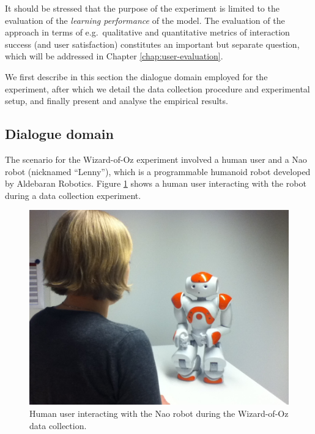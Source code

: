 
It should be stressed that the purpose of the experiment is limited to the evaluation of the \textit{learning performance} of the model. The evaluation of the approach in terms of e.g.\ qualitative and quantitative metrics of interaction success (and user satisfaction) constitutes an important but separate question, which will be addressed in Chapter \ref{chap:user-evaluation}. 

We first describe in this section the dialogue domain employed for the experiment, after which we detail the data collection procedure and experimental setup, and finally present and analyse the empirical results. 

\subsection{Dialogue domain}
\label{sec:wozlearning-experiments-domain}

The scenario for the Wizard-of-Oz experiment involved a human user and a Nao robot (nicknamed ``Lenny''), which is a programmable humanoid robot developed by Aldebaran Robotics. Figure \ref{fig:nao2} shows a human user interacting with the robot during a data collection experiment. 

\begin{figure}[ht]
\begin{center}
\includegraphics[scale=0.25]{imgs/bilde.jpg}
\end{center}
\caption{Human user interacting with the Nao robot during the Wizard-of-Oz data collection.}
\label{fig:nao2}
\end{figure}


